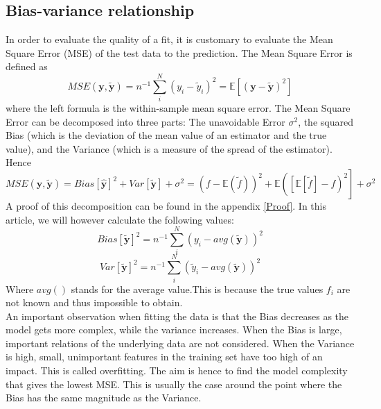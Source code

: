 \documentclass[11pt,a4paper,titlepage]{article}
\begin{document}
\subsection{Bias-variance relationship}
In order to evaluate the quality of a fit, it is customary to evaluate the Mean Square Error (MSE) of the test data to the prediction. The Mean Square Error is defined as
\begin{equation*}
MSE(\bm{y},\bm{\tilde y})=n^{-1}\sum_i^N\left(y_i - \tilde y_i \right)^2=\mathbb{E}\left[(\bm{y}-\bm{\tilde y})^2  \right]
\end{equation*}
where the left formula is the within-sample mean square error.
The Mean Square Error can be decomposed into three parts: The unavoidable Error $\sigma^2$, the squared Bias (which is the deviation of the mean value of an estimator and the true value), and the Variance (which is a measure of the spread of the estimator). Hence
\begin{equation*}
MSE(\bm{y},\bm{\tilde y})=Bias[ \bm{\hat y}]^2 + Var[ \bm{\tilde y}]+\sigma^2= \left(f-\mathbb{E}(\tilde f)\right)^2 + \mathbb{E}\left(\left[\mathbb{E}\left[ \tilde f \right]-f\right)^2 \right]+\sigma^2
\end{equation*}
A proof of this decomposition can be found in the appendix \eqref{Proof}.
In this article, we will however calculate the following values:
\begin{equation*}
Bias[\bm{\tilde y}]^2=n^{-1}\sum_i^N\left( y_i - avg( \bm{\tilde y})\right)^2
\end{equation*}
\begin{equation*}
Var[\bm{\tilde y}]^2=n^{-1}\sum_i^N\left(\tilde y_i - avg( \bm{\tilde y})\right)^2
\end{equation*}
Where $avg()$ stands for the average value.This is because the true values $f_i$ are not known and thus impossible to obtain.\\
An important observation when fitting the data is that the Bias decreases as the model gets more complex, while the variance increases. When the Bias is large, important relations of the underlying data are not considered. When the Variance is high, small, unimportant features in the training set have too high of an impact. This is called overfitting. The aim is hence to find the model complexity that gives the lowest MSE. This is usually the case around the point where the Bias has the same magnitude as the Variance.
\end{document}
